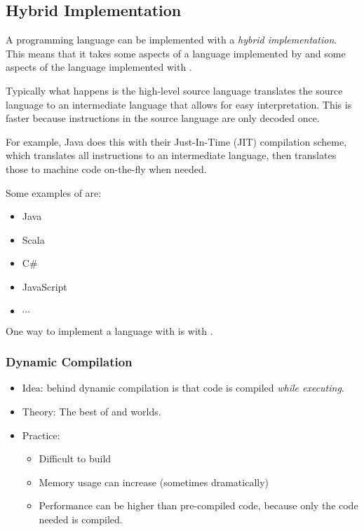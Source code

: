 \subsection{Hybrid Implementation}\label{subsec:Hybrid_Implementation}
\begin{definition}\label{def:Hybrid_Implementation}
  A programming language can be implemented with a \emph{hybrid implementation}.
  This means that it takes some aspects of a language implemented by  and some aspects of the language implemented with .

  Typically what happens is the high-level source language translates the source language to an intermediate language that allows for easy interpretation.
  This is faster because instructions in the source language are only decoded once.

  For example, Java does this with their Just-In-Time (JIT) compilation scheme, which translates all instructions to an intermediate language, then translates those to machine code on-the-fly when needed.

  Some examples of  are:
  \begin{itemize}[noitemsep]
  \item Java
  \item Scala
  \item C\#
  \item JavaScript
  \item $\cdots$
  \end{itemize}
\end{definition}

One way to implement a language with  is with .
\subsubsection{Dynamic Compilation}\label{subsubsec:Dynamic_Compilation}
\begin{itemize}[noitemsep]
\item Idea: behind dynamic compilation is that code is compiled \emph{while executing}.
\item Theory: The best of  and  worlds.
\item Practice:
  \begin{itemize}[noitemsep]
  \item Difficult to build
  \item Memory usage can increase (sometimes dramatically)
  \item Performance can be higher than pre-compiled code, because only the code needed is compiled.
  \end{itemize}
\end{itemize}

